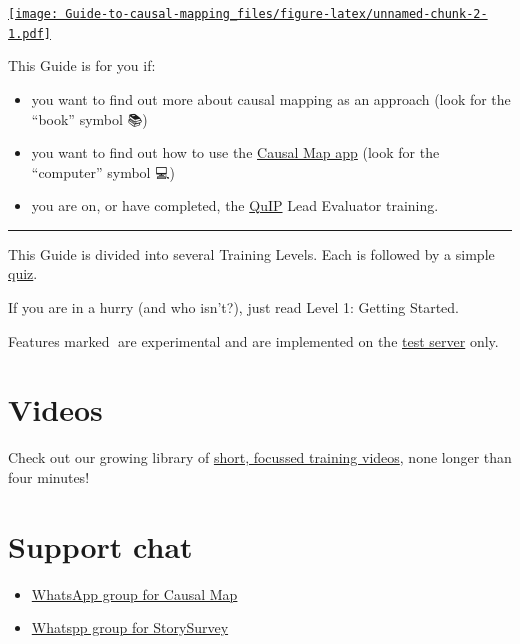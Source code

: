 \documentclass[
]{book}
\providecommand{\tightlist}{%
  \setlength{\itemsep}{0pt}\setlength{\parskip}{0pt}}
\begin{document}
\href{https://player.vimeo.com/video/689223728}{\texttt{[image: Guide-to-causal-mapping\_files/figure-latex/unnamed-chunk-2-1.pdf]}}

This Guide is for you if:

\begin{itemize}
\tightlist
\item
  you want to find out more about causal mapping as an approach (look for the ``book'' symbol 📚)
\item
  you want to find out how to use the \href{https://causalmap.app/}{Causal Map app} (look for the ``computer'' symbol 💻)
\item
  you are on, or have completed, the \href{https://bathsdr.org/about-the-quip/}{QuIP} Lead Evaluator training.
\end{itemize}

\begin{center}\rule{0.5\linewidth}{0.5pt}\end{center}

This Guide is divided into several Training Levels. Each is followed by a simple \href{https://causalmap.shinyapps.io/quizzes/}{quiz}.

If you are in a hurry (and who isn't?), just read Level 1: Getting Started.

Features marked 🧪are experimental and are implemented on the \href{https://causalmap.shinyapps.io/CM2test}{test server} only.

\hypertarget{videos}{%
\section{Videos}\label{videos}}

Check out our growing library of \href{https://guide.causalmap.app/xvideo-list.html}{short, focussed training videos}, none longer than four minutes!

\hypertarget{support-chat}{%
\section{Support chat}\label{support-chat}}

\begin{itemize}
\item
  \href{https://chat.whatsapp.com/KwWn0lfpHuR0qJKtkuGZUA}{WhatsApp group for Causal Map}
\item
  \href{https://chat.whatsapp.com/CdlkCKV8bP7ATYc4nioL0T}{Whatspp group for StorySurvey}
\end{itemize}
\end{document}
